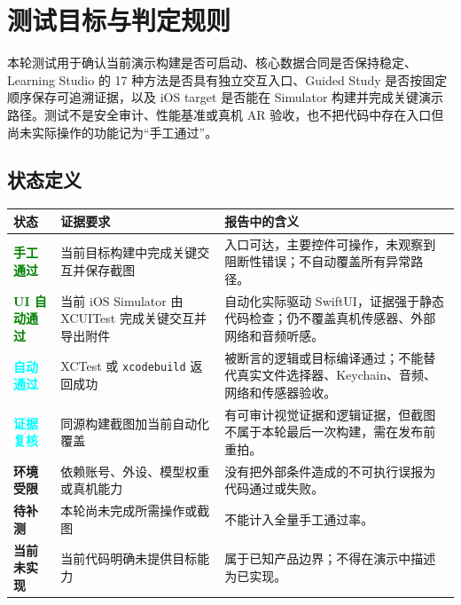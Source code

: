 \documentclass[10pt,a4paper,fontset=none]{ctexart}
\newcommand{\code}[1]{\begingroup\urlstyle{tt}\nolinkurl{#1}\endgroup}
\newcommand{\pill}[3]{\begingroup\setlength{\fboxsep}{3pt}\colorbox{#1}{\textcolor{#2}{\sffamily\bfseries\scriptsize #3}}\endgroup}
\newcommand{\ManualPass}{\pill{GreenPale}{Green}{手工通过}}
\newcommand{\UIPass}{\pill{GreenPale}{Green}{UI 自动通过}}
\newcommand{\AutoPass}{\pill{CyanPale}{Cyan}{自动通过}}
\newcommand{\EvidencePass}{\pill{CyanPale}{Cyan}{证据复核}}
\newcommand{\Limited}{\pill{AmberPale}{Amber}{环境受限}}
\newcommand{\Pending}{\pill{AmberPale}{Amber}{待补测}}
\newcommand{\NotImplemented}{\pill{GrayPale}{Muted}{当前未实现}}
\begin{document}
\tableofcontents
\clearpage

\section{测试目标与判定规则}

本轮测试用于确认当前演示构建是否可启动、核心数据合同是否保持稳定、Learning Studio 的 17 种方法是否具有独立交互入口、Guided Study 是否按固定顺序保存可追溯证据，以及 iOS target 是否能在 Simulator 构建并完成关键演示路径。测试不是安全审计、性能基准或真机 AR 验收，也不把代码中存在入口但尚未实际操作的功能记为“手工通过”。

\subsection{状态定义}
\begin{table}[htbp]
\centering
\small
\begin{tabularx}{\textwidth}{P{28mm}P{42mm}Y}
\toprule
状态 & 证据要求 & 报告中的含义 \\
\midrule
\ManualPass & 当前目标构建中完成关键交互并保存截图 & 入口可达，主要控件可操作，未观察到阻断性错误；不自动覆盖所有异常路径。 \\
\UIPass & 当前 iOS Simulator 由 XCUITest 完成关键交互并导出附件 & 自动化实际驱动 SwiftUI，证据强于静态代码检查；仍不覆盖真机传感器、外部网络和音频听感。 \\
\AutoPass & XCTest 或 \code{xcodebuild} 返回成功 & 被断言的逻辑或目标编译通过；不能替代真实文件选择器、Keychain、音频、网络和传感器验收。 \\
\EvidencePass & 同源构建截图加当前自动化覆盖 & 有可审计视觉证据和逻辑证据，但截图不属于本轮最后一次构建，需在发布前重拍。 \\
\Limited & 依赖账号、外设、模型权重或真机能力 & 没有把外部条件造成的不可执行误报为代码通过或失败。 \\
\Pending & 本轮尚未完成所需操作或截图 & 不能计入全量手工通过率。 \\
\NotImplemented & 当前代码明确未提供目标能力 & 属于已知产品边界；不得在演示中描述为已实现。 \\
\bottomrule
\end{tabularx}
\end{table}
\end{document}
